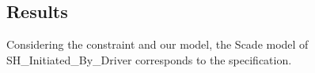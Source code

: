 \subsection{Results}
Considering the constraint and our model, the Scade model of
SH\_Initiated\_By\_Driver corresponds to the specification.


